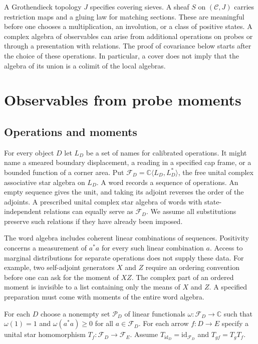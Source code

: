 \documentclass[11pt,letterpaper]{article}
\newcommand{\F}{\mathcal F}
\newcommand{\Probes}{\mathcal P}
\newcommand{\id}{\mathrm{id}}
\begin{document}
A Grothendieck topology $J$ specifies covering sieves. A sheaf $S$ on $(\mathcal C,J)$ carries restriction maps and a gluing law for matching sections. These are meaningful before one chooses a multiplication, an involution, or a class of positive states. A complex algebra of observables can arise from additional operations on probes or through a presentation with relations. The proof of covariance below starts after the choice of these operations. In particular, a cover does not imply that the algebra of its union is a colimit of the local algebras.

\section{Observables from probe moments}
\label{sec:probes}

\subsection{Operations and moments}

For every object $D$ let $L_D$ be a set of names for calibrated operations. It might name a smeared boundary displacement, a reading in a specified cap frame, or a bounded function of a corner area. Put $\F_D=\mathbb C\langle L_D,L_D^{*}\rangle$, the free unital complex associative star algebra on $L_D$. A word records a sequence of operations. An empty sequence gives the unit, and taking its adjoint reverses the order of the adjoints. A prescribed unital complex star algebra of words with state-independent relations can equally serve as $\F_D$. We assume all substitutions preserve such relations if they have already been imposed.

The word algebra includes coherent linear combinations of sequences. Positivity concerns a measurement of $a^{*}a$ for every such linear combination $a$. Access to marginal distributions for separate operations does not supply these data. For example, two self-adjoint generators $X$ and $Z$ require an ordering convention before one can ask for the moment of $XZ$. The complex part of an ordered moment is invisible to a list containing only the means of $X$ and $Z$. A specified preparation must come with moments of the entire word algebra.

\begin{definition}
For each $D$ choose a nonempty set $\Probes_D$ of linear functionals $\omega:\F_D\to\mathbb C$ such that $\omega(1)=1$ and $\omega(a^*a)\ge0$ for all $a\in\F_D$. For each arrow $f:D\to E$ specify a unital star homomorphism $T_f:\F_D\to\F_E$. Assume $T_{\id_D}=\id_{\F_D}$ and $T_{gf}=T_gT_f$.
\end{definition}
\end{document}
